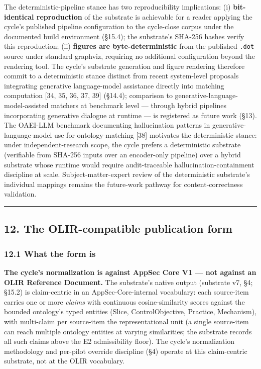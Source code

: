 \documentclass[
]{article}
\begin{document}
The deterministic-pipeline stance has two reproducibility implications:
(i) \textbf{bit-identical reproduction} of the substrate is achievable
for a reader applying the cycle's published pipeline configuration to
the cycle-close corpus under the documented build environment (§15.4);
the substrate's SHA-256 hashes verify this reproduction; (ii)
\textbf{figures are byte-deterministic} from the published \texttt{.dot}
source under standard graphviz, requiring no additional configuration
beyond the rendering tool. The cycle's substrate generation and figure
rendering therefore commit to a deterministic stance distinct from
recent system-level proposals integrating generative language-model
assistance directly into matching computation {[}34, 35, 36, 37, 39{]}
(§14.4); comparison to generative-language-model-assisted matchers at
benchmark level --- through hybrid pipelines incorporating generative
dialogue at runtime --- is registered as future work (§13). The OAEI-LLM
benchmark documenting hallucination patterns in
generative-language-model use for ontology-matching {[}38{]} motivates
the deterministic stance: under independent-research scope, the cycle
prefers a deterministic substrate (verifiable from SHA-256 inputs over
an encoder-only pipeline) over a hybrid substrate whose runtime would
require audit-traceable hallucination-containment discipline at scale.
Subject-matter-expert review of the deterministic substrate's individual
mappings remains the future-work pathway for content-correctness
validation.

\begin{center}\rule{0.5\linewidth}{0.5pt}\end{center}

\subsection{12. The OLIR-compatible publication
form}\label{the-olir-compatible-publication-form}

\subsubsection{12.1 What the form is}\label{what-the-form-is}

\textbf{The cycle's normalization is against AppSec Core V1 --- not
against an OLIR Reference Document.} The substrate's native output
(substrate v7, §4; §15.2) is claim-centric in an AppSec-Core-internal
vocabulary: each source-item carries one or more \emph{claims} with
continuous cosine-similarity scores against the bounded ontology's typed
entities (Slice, ControlObjective, Practice, Mechanism), with
multi-claim per source-item the representational unit (a single
source-item can reach multiple ontology entities at varying
similarities; the substrate records all such claims above the E2
admissibility floor). The cycle's normalization methodology and
per-pilot override discipline (§4) operate at this claim-centric
substrate, not at the OLIR vocabulary.
\end{document}
